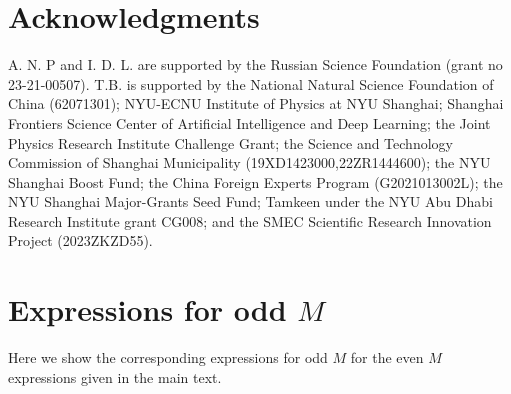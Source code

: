 \documentclass[12pt]{iopart}
\begin{document}









\section{Acknowledgments}

A. N. P and I. D. L.  are supported by the Russian Science Foundation (grant no 23-21-00507). T.B. is supported by the National Natural Science Foundation of China (62071301); NYU-ECNU Institute of Physics at NYU Shanghai; Shanghai Frontiers Science Center of Artificial Intelligence and Deep Learning; the Joint Physics Research Institute Challenge Grant; the Science and Technology Commission of Shanghai Municipality (19XD1423000,22ZR1444600); the NYU Shanghai Boost Fund; the China Foreign Experts Program (G2021013002L); the NYU Shanghai Major-Grants Seed Fund; Tamkeen under the NYU Abu Dhabi Research Institute grant CG008; and the SMEC Scientific Research Innovation Project (2023ZKZD55).


\appendix

\section{Expressions for odd $ M $}
\label{sec:oddMexpressions}

Here we show the corresponding expressions for odd $ M $ for the even $ M $ expressions given in the main text. 
\end{document}
